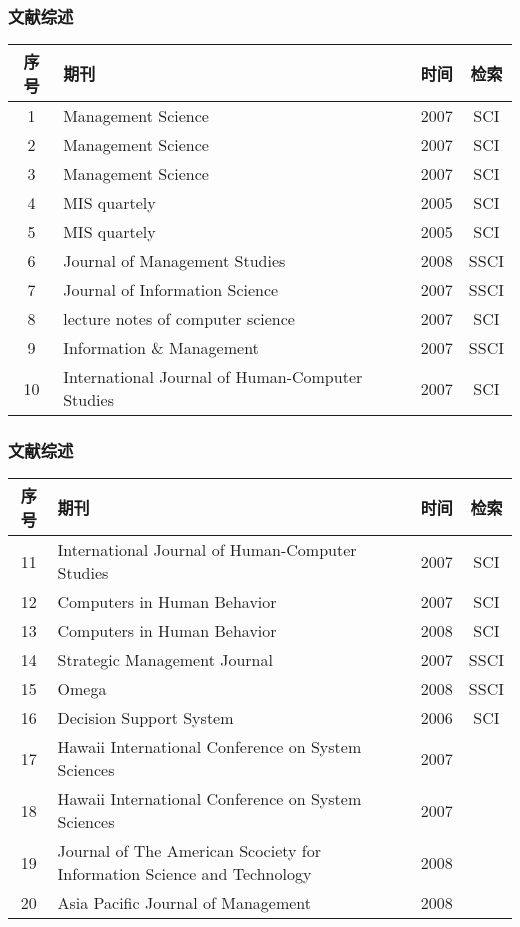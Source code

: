 \documentclass[slidestop,compress,mathserif,blue,compress]{beamer}
\begin{document}
\begin{frame}[allowframebreaks]
  \frametitle{文献综述}
  
    \begin{tabular}[center]{|c|p{8cm}|c|c|}
\hline\small

      序号&期刊&时间&检索 \\\hline
     1&Management Science &2007&SCI \\\hline
    2&Management Science &2007& SCI \\\hline
     3&Management Science &2007&SCI \\\hline
     4&MIS quartely&2005&SCI \\\hline
     5&MIS quartely&2005&SCI \\\hline
    6&Journal of Management Studies  &2008&SSCI \\\hline
  7&Journal of Information Science  &2007&SSCI  \\\hline
  8&lecture notes  of computer science &2007&SCI  \\\hline
  9&Information \& Management&2007&SSCI \\\hline
  10&International Journal of Human-Computer Studies&2007&SCI \\\hline


    \end{tabular}
    
\end{frame}

\begin{frame}[allowframebreaks]
  \frametitle{文献综述}
  
    \begin{tabular}[center]{|c|p{8cm}|c|c|}
\hline\small

      序号&期刊&时间&检索 \\\hline
     11&International Journal of Human-Computer Studies&2007&SCI \\\hline
12&Computers in Human Behavior&2007&SCI \\\hline
13&Computers in Human Behavior&2008&SCI \\\hline
 14&Strategic Management Journal &2007&SSCI \\\hline
  15&Omega&2008&SSCI \\\hline
  16&Decision Support System&2006&SCI \\\hline
 17&Hawaii International Conference on System Sciences &2007& \\\hline
18&Hawaii International Conference on System Sciences &2007& \\\hline
19&Journal  of The  American Scociety  for  Information Science and Technology &2008& \\\hline
20&Asia Pacific Journal of Management&2008& \\\hline


    \end{tabular}
    
\end{frame}
\end{document}
